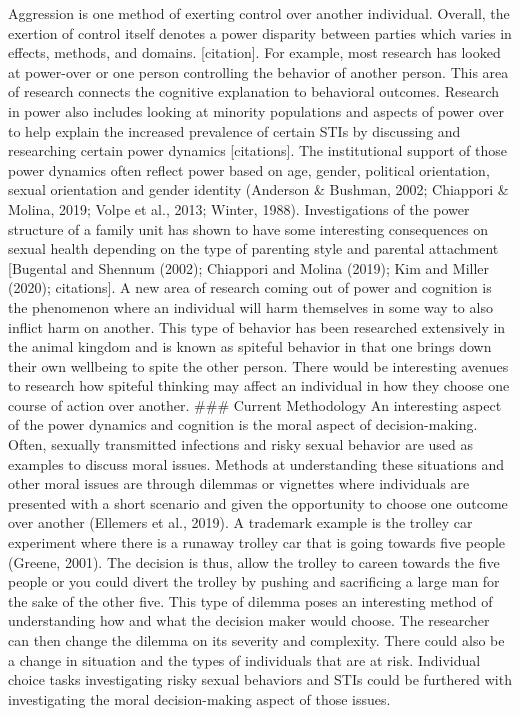\documentclass[
  english,
  donotrepeattitle,doc, 12pt, a4paper,floatsintext]{apa7}
\begin{document}
Aggression is one method of exerting control over another individual. Overall, the exertion of control itself denotes a power disparity between parties which varies in effects, methods, and domains. {[}citation{]}. For example, most research has looked at power-over or one person controlling the behavior of another person. This area of research connects the cognitive explanation to behavioral outcomes. Research in power also includes looking at minority populations and aspects of power over to help explain the increased prevalence of certain STIs by discussing and researching certain power dynamics {[}citations{]}. The institutional support of those power dynamics often reflect power based on age, gender, political orientation, sexual orientation and gender identity (Anderson \& Bushman, 2002; Chiappori \& Molina, 2019; Volpe et al., 2013; Winter, 1988). Investigations of the power structure of a family unit has shown to have some interesting consequences on sexual health depending on the type of parenting style and parental attachment {[}Bugental and Shennum (2002); Chiappori and Molina (2019); Kim and Miller (2020); citations{]}. A new area of research coming out of power and cognition is the phenomenon where an individual will harm themselves in some way to also inflict harm on another. This type of behavior has been researched extensively in the animal kingdom and is known as spiteful behavior in that one brings down their own wellbeing to spite the other person. There would be interesting avenues to research how spiteful thinking may affect an individual in how they choose one course of action over another.
\#\#\# Current Methodology
An interesting aspect of the power dynamics and cognition is the moral aspect of decision-making. Often, sexually transmitted infections and risky sexual behavior are used as examples to discuss moral issues. Methods at understanding these situations and other moral issues are through dilemmas or vignettes where individuals are presented with a short scenario and given the opportunity to choose one outcome over another (Ellemers et al., 2019). A trademark example is the trolley car experiment where there is a runaway trolley car that is going towards five people (Greene, 2001). The decision is thus, allow the trolley to careen towards the five people or you could divert the trolley by pushing and sacrificing a large man for the sake of the other five. This type of dilemma poses an interesting method of understanding how and what the decision maker would choose. The researcher can then change the dilemma on its severity and complexity. There could also be a change in situation and the types of individuals that are at risk. Individual choice tasks investigating risky sexual behaviors and STIs could be furthered with investigating the moral decision-making aspect of those issues.
\end{document}

